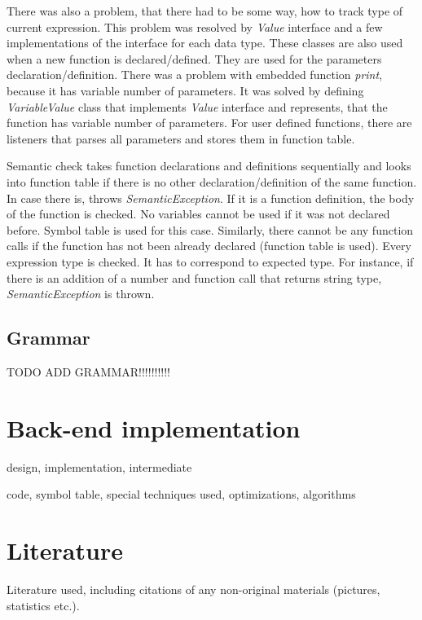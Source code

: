 There was also a problem, that there had to be some way, how to track type of current expression. This problem was resolved by \textit{Value} interface and a few implementations of the interface for each data type. These classes are also used when a new function is declared/defined. They are used for the parameters declaration/definition. There was a problem with embedded function \textit{print}, because it has variable number of parameters. It was solved by defining \textit{VariableValue} class that implements \textit{Value} interface and represents, that the function has variable number of parameters. For user defined functions, there are listeners that parses all parameters and stores them in function table.

Semantic check takes function declarations and definitions sequentially and looks into function table if there is no other declaration/definition of the same function. In case there is, throws \textit{SemanticException}. If it is a function definition, the body of the function is checked. No variables cannot be used if it was not declared before. Symbol table is used for this case. Similarly, there cannot be any function calls if the function has not been already declared (function table is used). Every expression type is checked. It has to correspond to expected type. For instance, if there is an addition of a number and function call that returns string type, \textit{SemanticException} is thrown. 

 

\subsection{Grammar}
\label{sec:grammar}

TODO ADD GRAMMAR!!!!!!!!!!

\section{Back-end implementation}
design, implementation, intermediate

code, symbol table, special techniques used, optimizations, algorithms

\section{Literature}
Literature used, including citations of any non-original materials (pictures, statistics
etc.).